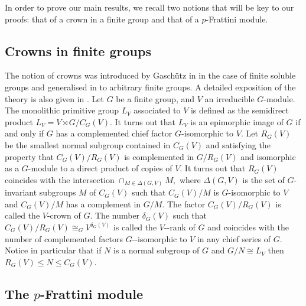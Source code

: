 \documentclass[10pt,a4paper]{amsart}
\providecommand{\nobreakdash}{\nobreak\hbox{-}}
\begin{document}
\medskip

In order to prove our main results, we recall two notions that will be key to our proofs: that of a crown in a finite group and that of a $p$-Frattini module.


\subsection{Crowns in finite groups}

The notion of crowns was introduced by Gasch\"{u}tz  in \cite{praef} in the case of finite soluble groups and generalised in \cite{JL} to arbitrary finite groups.
A detailed exposition of the theory is also given in \cite[Section 1.3]{boez}.
Let $G$ be  a finite group, and $V$ an irreducible $G$-module. The monolithic primitive group $L_V$ associated to $V$ is defined as the semidirect product $L_V=V \rtimes G/C_G(V).$ It turns out that $L_V$ is an epimorphic image of $G$ if and only if $G$ has a complemented chief factor $G$-isomorphic to $V.$ Let $R_G(V)$ be the smallest normal subgroup contained in $C_G(V)$ and satisfying
the property that $C_G(V)/R_G(V)$ is complemented in $G/R_G(V)$ and isomorphic as a $G$-module to a direct product of copies of $V.$ It turns out that
$R_G(V)$ coincides with the intersection $\cap_{M \in \Delta(G,V)}M,$ where $\Delta(G,V)$ is the set of $G$-invariant
subgroups $M$ of $C_G(V)$ such that $C_G(V)/M$ is $G$-isomorphic to $V$ and $C_G(V)/M$ has a complement in $G/M.$ The
factor $C_G(V)/R_G(V)$ is called the $V$-crown of $G$. The number $\delta_G(V)$ such that $C_G(V)/R_G(V)\cong_G
V^{\delta_G(V)}$
is called the 
	$V$\nobreakdash-rank of $G$ and coincides with the number of
complemented factors $G$\nobreakdash-isomorphic to $V$ in any
chief series of $G.$ Notice in particular that if $N$ is a normal subgroup of $G$ and $G/N \cong L_V$ then $R_G(V)\leq N\leq C_G(V).$

\subsection{The $p$-Frattini module}\label{subsec:fratti_mod}
\end{document}
